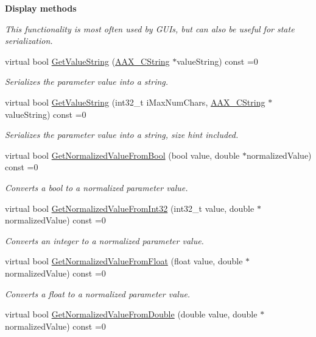 \begin{Indent}{\bf Display methods}\par
{\em This functionality is most often used by G\+U\+Is, but can also be useful for state serialization. }\begin{DoxyCompactItemize}
\item 
virtual bool \hyperlink{a00108_a0b20c4210f4bb6e6f00de8817051dfb8}{Get\+Value\+String} (\hyperlink{a00042}{A\+A\+X\+\_\+\+C\+String} $\ast$value\+String) const =0
\begin{DoxyCompactList}\small\item\em Serializes the parameter value into a string. \end{DoxyCompactList}\item 
virtual bool \hyperlink{a00108_a563ff5b1730d926c57f1d2420cc1aca0}{Get\+Value\+String} (int32\+\_\+t i\+Max\+Num\+Chars, \hyperlink{a00042}{A\+A\+X\+\_\+\+C\+String} $\ast$value\+String) const =0
\begin{DoxyCompactList}\small\item\em Serializes the parameter value into a string, size hint included. \end{DoxyCompactList}\item 
virtual bool \hyperlink{a00108_a10583b56f9c1c51e99a5b3413e3ed359}{Get\+Normalized\+Value\+From\+Bool} (bool value, double $\ast$normalized\+Value) const =0
\begin{DoxyCompactList}\small\item\em Converts a bool to a normalized parameter value. \end{DoxyCompactList}\item 
virtual bool \hyperlink{a00108_aaf7408ff1823e27534452593230e5437}{Get\+Normalized\+Value\+From\+Int32} (int32\+\_\+t value, double $\ast$normalized\+Value) const =0
\begin{DoxyCompactList}\small\item\em Converts an integer to a normalized parameter value. \end{DoxyCompactList}\item 
virtual bool \hyperlink{a00108_af4f7271d7c3b016235a81b6324bdb328}{Get\+Normalized\+Value\+From\+Float} (float value, double $\ast$normalized\+Value) const =0
\begin{DoxyCompactList}\small\item\em Converts a float to a normalized parameter value. \end{DoxyCompactList}\item 
virtual bool \hyperlink{a00108_a8ac820142f113788408d060d5054ff17}{Get\+Normalized\+Value\+From\+Double} (double value, double $\ast$normalized\+Value) const =0

\end{DoxyCompactItemize}
\end{Indent}
